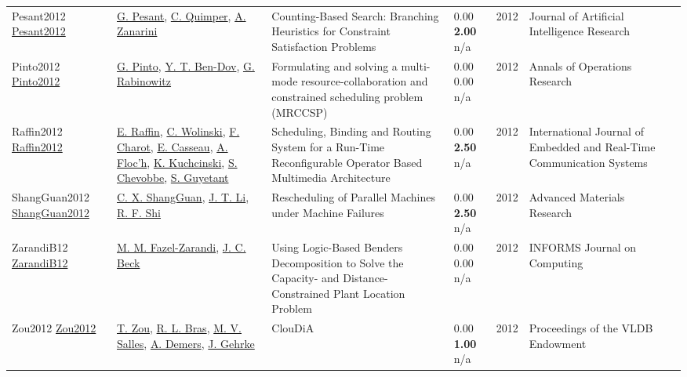 {\begin{longtable}{p{3cm}p{5cm}p{10cm}p{1cm}rp{2.5cm}l}
Pesant2012 \href{http://dx.doi.org/10.1613/jair.3463}{Pesant2012} & \hyperref[auth:a1586]{G. Pesant}, \hyperref[auth:a1587]{C. Quimper}, \hyperref[auth:a1588]{A. Zanarini} & \cellcolor{gold!20}Counting-Based Search: Branching Heuristics for Constraint Satisfaction Problems & \noindent{}\textcolor{black!50}{0.00} \textbf{2.00} n/a & 2012 & Journal of Artificial Intelligence Research & \cite{Pesant2012}\\
Pinto2012 \href{http://dx.doi.org/10.1007/s10479-012-1256-5}{Pinto2012} & \hyperref[auth:a1598]{G. Pinto}, \hyperref[auth:a1599]{Y. T. Ben-Dov}, \hyperref[auth:a1600]{G. Rabinowitz} & Formulating and solving a multi-mode resource-collaboration and constrained scheduling problem (MRCCSP) & \noindent{}\textcolor{black!50}{0.00} \textcolor{black!50}{0.00} n/a & 2012 & Annals of Operations Research & \cite{Pinto2012}\\
Raffin2012 \href{http://dx.doi.org/10.4018/jertcs.2012010101}{Raffin2012} & \hyperref[auth:a1531]{E. Raffin}, \hyperref[auth:a659]{C. Wolinski}, \hyperref[auth:a1532]{F. Charot}, \hyperref[auth:a1533]{E. Casseau}, \hyperref[auth:a1534]{A. Floc’h}, \hyperref[auth:a660]{K. Kuchcinski}, \hyperref[auth:a1535]{S. Chevobbe}, \hyperref[auth:a1536]{S. Guyetant} & \cellcolor{green!10}Scheduling, Binding and Routing System for a Run-Time Reconfigurable Operator Based Multimedia Architecture & \noindent{}\textcolor{black!50}{0.00} \textbf{2.50} n/a & 2012 & International Journal of Embedded and Real-Time Communication Systems & \cite{Raffin2012}\\
ShangGuan2012 \href{http://dx.doi.org/10.4028/www.scientific.net/amr.443-444.724}{ShangGuan2012} & \hyperref[auth:a1983]{C. X. ShangGuan}, \hyperref[auth:a1984]{J. T. Li}, \hyperref[auth:a1985]{R. F. Shi} & Rescheduling of Parallel Machines under Machine Failures & \noindent{}\textcolor{black!50}{0.00} \textbf{2.50} n/a & 2012 & Advanced Materials Research & \cite{ShangGuan2012}\\
ZarandiB12 \href{http://dx.doi.org/10.1287/ijoc.1110.0458}{ZarandiB12} & \hyperref[auth:a945]{M. M. Fazel-Zarandi}, \hyperref[auth:a89]{J. C. Beck} & Using Logic-Based Benders Decomposition to Solve the Capacity- and Distance-Constrained Plant Location Problem & \noindent{}\textcolor{black!50}{0.00} \textcolor{black!50}{0.00} n/a & 2012 & \cellcolor{red!20}INFORMS Journal on Computing & \cite{ZarandiB12}\\
Zou2012 \href{http://dx.doi.org/10.14778/2535568.2448945}{Zou2012} & \hyperref[auth:a2054]{T. Zou}, \hyperref[auth:a2055]{R. L. Bras}, \hyperref[auth:a2056]{M. V. Salles}, \hyperref[auth:a2057]{A. Demers}, \hyperref[auth:a2058]{J. Gehrke} & ClouDiA & \noindent{}\textcolor{black!50}{0.00} \textbf{1.00} n/a & 2012 & Proceedings of the VLDB Endowment & \cite{Zou2012}\\

\end{longtable}}
